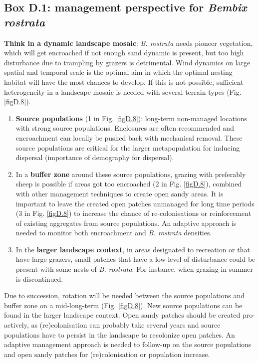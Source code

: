 \documentclass[10pt, twoside]{book} %
\begin{document}
	\begin{tcolorbox}[box, breakable, boxrule=1pt,toprule at break=1pt,extras={toprule at break=1pt}]
		\subsection*{\textbf{Box D.1:} management perspective for \textit{Bembix rostrata}}
		\textbf{Think in a dynamic landscape mosaic}: \textit{B. rostrata} needs pioneer vegetation, which will get encroached if not enough sand dynamic is present, but too high disturbance due to trampling by grazers is detrimental. Wind dynamics on large spatial and temporal scale is the optimal aim in which the optimal nesting habitat will have the most chances to develop. If this is not possible, sufficient heterogeneity in a landscape mosaic is needed with several terrain types (Fig. \ref{figD.8}).\\
		\begin{enumerate}
			\item \textbf{Source populations} (1 in Fig. \ref{figD.8}): long-term non-managed locations with strong source populations. Enclosures are often recommended and encroachment can locally be pushed back with mechanical removal. These source populations are critical for the larger metapopulation for inducing dispersal (importance of demography for dispersal).
			
			\item In a \textbf{buffer zone} around these source populations, grazing with preferably sheep is possible if areas got too encroached (2 in Fig. \ref{figD.8}), combined with other management techniques to create open sandy areas. It is important to leave the created open patches unmanaged for long time periods (3 in Fig. \ref{figD.8}) to increase the chance of re-colonisations or reinforcement of existing aggregates from source populations. An adaptive approach is needed to monitor both encroachment and \textit{B. rostrata} densities.
			
			\item In the \textbf{larger landscape context}, in areas designated to recreation or that have large grazers, small patches that have a low level of disturbance could be present with some nests of \textit{B. rostrata}. For instance, when grazing in summer is discontinued.
			
		\end{enumerate}
	
	Due to succession, rotation will be needed between the source populations and buffer zone on a mid-long-term (Fig. \ref{figD.8}). New source populations can be found in the larger landscape context. Open sandy patches should be created pro-actively, as (re)colonisation can probably take several years and source populations have to persist in the landscape to recolonize open patches. An adaptive management approach is needed to follow-up on the source populations and open sandy patches for (re)colonisation or population increase.\\
	\clearpage
	

\end{tcolorbox}
\end{document}
